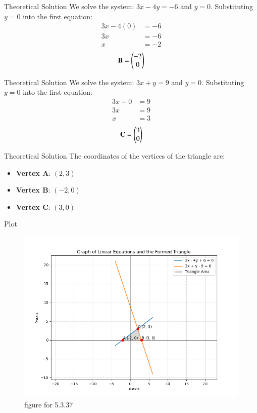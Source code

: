 \documentclass{beamer}
\begin{document}
\begin{frame}{Theoretical Solution}
We solve the system: $3x - 4y = -6$ and $y = 0$.
\bigskip
Substituting $y=0$ into the first equation:
\begin{align}
    3x - 4(0) &= -6 \\
    3x &= -6 \\
    x &= -2
\end{align}
\bigskip
\begin{align}
    \mathbf{B}=\begin{pmatrix}-2 \\ 0\end{pmatrix}
\end{align}
\end{frame}

\begin{frame}{Theoretical Solution}
We solve the system: $3x + y = 9$ and $y = 0$.
\bigskip
Substituting $y=0$ into the first equation:
\begin{align}
    3x + 0 &= 9 \\
    3x &= 9 \\
    x &= 3
\end{align}
\bigskip
\begin{align}
    \mathbf{C}=\begin{pmatrix}3 \\ 0\end{pmatrix}
\end{align}
\end{frame}

\begin{frame}{Theoretical Solution}
The coordinates of the vertices of the triangle are:
\begin{itemize}
    \item \textbf{Vertex A}: $(2, 3)$
    \item \textbf{Vertex B}: $(-2, 0)$
    \item \textbf{Vertex C}: $(3, 0)$
\end{itemize}
\end{frame}

\begin{frame}{Plot}
\centering
\begin{figure}[h!]
    \centering
    \includegraphics[width=0.8\columnwidth]{figs/fig1.png}
    \caption{figure for 5.3.37}
\end{figure}
\end{frame}
\end{document}
